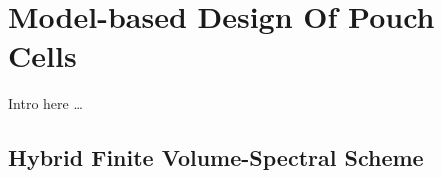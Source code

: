 
\graphicspath{{3/figures/}}

\chapter{Model-based Design Of Pouch Cells}\label{ch:modelbaseddesign}
\startcontents[chapters]

\bigskip
Intro here \dots

\section{Hybrid Finite Volume-Spectral Scheme}\label{sec:hybrid fv-spectral}

